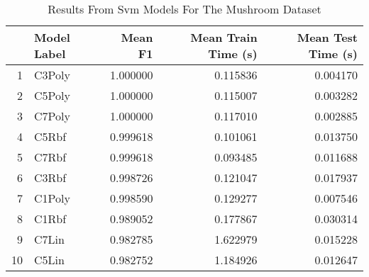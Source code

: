 \begin{table}
\centering
\caption{Results From Svm Models For The Mushroom Dataset}
\label{tab:svm_results_mushroom}
\begin{tabular}{rlrrr}
\toprule
 & Model Label & Mean F1 & Mean Train Time (s) & Mean Test Time (s) \\
\midrule
1 & C3Poly & 1.000000 & 0.115836 & 0.004170 \\
2 & C5Poly & 1.000000 & 0.115007 & 0.003282 \\
3 & C7Poly & 1.000000 & 0.117010 & 0.002885 \\
4 & C5Rbf & 0.999618 & 0.101061 & 0.013750 \\
5 & C7Rbf & 0.999618 & 0.093485 & 0.011688 \\
6 & C3Rbf & 0.998726 & 0.121047 & 0.017937 \\
7 & C1Poly & 0.998590 & 0.129277 & 0.007546 \\
8 & C1Rbf & 0.989052 & 0.177867 & 0.030314 \\
9 & C7Lin & 0.982785 & 1.622979 & 0.015228 \\
10 & C5Lin & 0.982752 & 1.184926 & 0.012647 \\
\bottomrule
\end{tabular}
\end{table}
